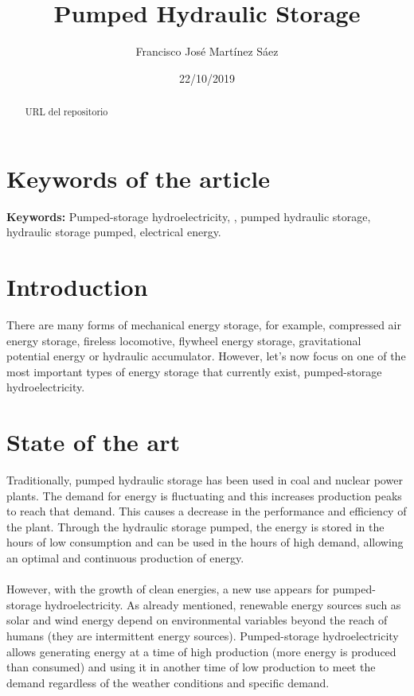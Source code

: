 \documentclass[a4paper,11 pt]{article}
\begin{document}
\title {Pumped Hydraulic Storage }
\author{Francisco José Martínez Sáez}
\date{22/10/2019}
\maketitle
\begin{abstract}
URL del repositorio
\end{abstract}


\section {Keywords of the article}
{\bf Keywords:} Pumped-storage hydroelectricity, , pumped hydraulic storage, hydraulic storage pumped, electrical energy.

\section {Introduction}
There are many forms of mechanical energy storage, for example, compressed air energy storage, fireless locomotive, flywheel energy storage, gravitational potential energy or hydraulic accumulator. However, let's now focus on one of the most important types of energy storage that currently exist, pumped-storage hydroelectricity.

\section {State of the art}
Traditionally, pumped hydraulic storage has been used in coal and nuclear power plants. The demand for energy is fluctuating and this increases production peaks to reach that demand. This causes a decrease in the performance and efficiency of the plant. Through the hydraulic storage pumped, the energy is stored in the hours of low consumption and can be used in the hours of high demand, allowing an optimal and continuous production of energy. \cite{Wilson2018}\\ \\
However, with the growth of clean energies, a new use appears for pumped-storage hydroelectricity. As already mentioned, renewable energy sources such as solar and wind energy depend on environmental variables beyond the reach of humans (they are intermittent energy sources). Pumped-storage hydroelectricity allows generating energy at a time of high production (more energy is produced than consumed) and using it in another time of low production to meet the demand regardless of the weather conditions and specific demand. \cite{Roca2017} \cite{Wilson2018}\\ \\
\end{document}
